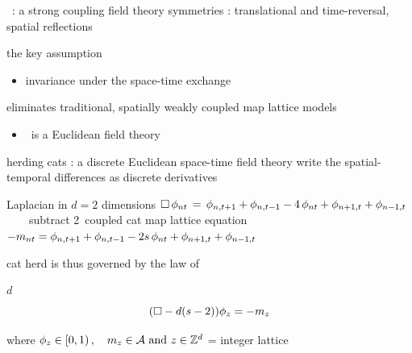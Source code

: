 \begin{frame}{\catlatt\ : a strong coupling field theory}
symmetries : translational and time-reversal, spatial reflections

\bigskip

\begin{block}{the key assumption}
\begin{itemize}
\item  invariance under the space-time exchange
\end{itemize}
\end{block}
eliminates traditional, spatially
weakly coupled map lattice models
\bigskip
%
%
%
\vfill

\begin{itemize}
  \item \catlatt\ is a Euclidean field theory
\end{itemize}
\end{frame}

\begin{frame}{herding cats : a discrete Euclidean space-time field theory}
write the spatial-temporal differences as discrete derivatives
\begin{block}{Laplacian in %
              $d=2$ dimensions}
\(
\Box\,\phi_{nt} \,=\, \phi_{n,t+1} + \phi_{n,t-1}
- 4 \, \phi_{nt} + \phi_{n+1,t} + \phi_{n-1, t}
\)\\
~~~~{\scriptsize subtract 2\dmn\ coupled cat map lattice equation}\\
\(
-{m_{n t}}
 =
\phi_{n,t+1} + \phi_{n,t-1} - 2s \, \phi_{n t} + \phi_{n+1,t} + \phi_{n-1, t}
\) %
\end{block}

\bigskip

{\color{blue}cat herd} is thus governed by the law of
\begin{block}{$d$\dmn\ \catlatt}
\[
 (\Box - d(s-2))\phi_{z} = - m_z
\] %

\medskip

\end{block}

\bigskip

where
\(
  \phi_{z} \in [0,1)
    \,, \quad
  {\ensuremath{m_{z}}} \in \mathcal{A}
    \mbox{  and  }
  z\in \mathbb{Z}^{d}
\) = integer lattice
\end{frame}

